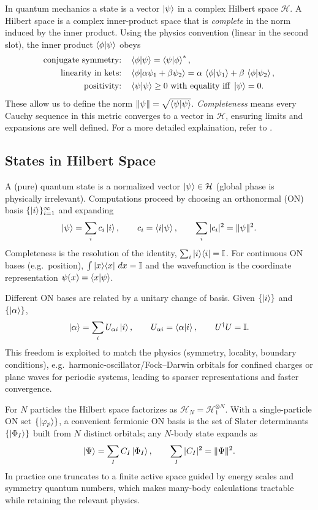 In quantum mechanics a state is a vector $\ket{\psi}$ in a complex Hilbert space $\mathcal H$.
A Hilbert space is a complex inner-product space that is \emph{complete} in the norm induced by
the inner product. Using the physics convention (linear in the second slot),
the inner product $\braket{\phi|\psi}$ obeys
\begin{align*}
\text{conjugate symmetry:}\quad & \braket{\phi|\psi}=\braket{\psi|\phi}^*,\\
\text{linearity in kets:}\quad & \braket{\phi|\alpha\psi_1+\beta\psi_2}
= \alpha\,\braket{\phi|\psi_1}+\beta\,\braket{\phi|\psi_2},\\
\text{positivity:}\quad & \braket{\psi|\psi}\ge 0 \text{ with equality iff } \ket{\psi}=0.
\end{align*}
These allow us to define the norm $\|\psi\|=\sqrt{\braket{\psi|\psi}}$. \emph{Completeness} means every Cauchy sequence in this metric
converges to a vector in $\mathcal H$, ensuring limits and expansions are well defined. For a more detailed explaination, refer to \cite{BereraDelDebbio2021-QuantumMechanics,GriffithsSchroeter2018-IntroQM}.


\subsection{States in Hilbert Space}

A (pure) quantum state is a normalized vector $\ket{\psi}\in\mathcal H$ (global phase is
physically irrelevant). Computations proceed by choosing an orthonormal (ON) basis
$\{\ket{i}\}_{i=1}^\infty$ and expanding
\[
\ket{\psi}=\sum_{i} c_i \ket{i}, \qquad
c_i=\braket{i|\psi}, \qquad \sum_i |c_i|^2=\|\psi\|^2 .
\]
Completeness is the resolution of the identity,
$\sum_i \ket{i}\!\bra{i}=\mathbb I$. For continuous ON bases (e.g.\ position),
$\int \ket{x}\!\bra{x}\,dx=\mathbb I$ and the wavefunction is the coordinate
representation $\psi(x)=\braket{x|\psi}$.

Different ON bases are related by a unitary change of basis. Given
$\{\ket{i}\}$ and $\{\ket{\alpha}\}$,
\[
\ket{\alpha}=\sum_i U_{\alpha i}\ket{i}, \qquad
U_{\alpha i}=\braket{\alpha|i}, \qquad U^\dagger U=\mathbb I .
\]
This freedom is exploited to match the physics (symmetry, locality, boundary conditions),
e.g.\ harmonic-oscillator/Fock–Darwin orbitals for confined charges or plane waves for
periodic systems, leading to sparser representations and faster convergence.

For $N$ particles the Hilbert space factorizes as
$\mathcal H_N=\mathcal H_1^{\otimes N}$. With a single-particle ON set
$\{\ket{\varphi_p}\}$, a convenient fermionic ON basis is the set of Slater determinants
$\{\ket{\Phi_I}\}$ built from $N$ distinct orbitals; any $N$-body state expands as
\[
\ket{\Psi}=\sum_{I} C_I \ket{\Phi_I}, \qquad \sum_I |C_I|^2=\|\Psi\|^2 .
\]
In practice one truncates to a finite active space guided by energy scales and symmetry
quantum numbers, which makes many-body calculations tractable while retaining the relevant
physics.

